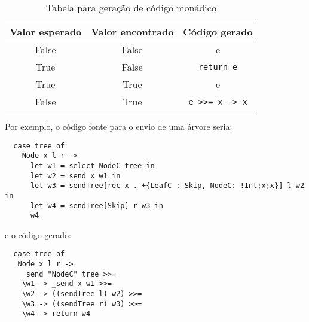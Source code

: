 


\begin{table}
\begin{center}
  \begin{tabular}[ht!]{| c | c | c |}
    \hline  
    \quad Valor esperado \quad&\quad Valor encontrado \quad&\quad Código gerado \quad\\\hline
    False & False & e \\
    True & False & \lstinline"return e" \\
    True & True & e \\
    False & True & \lstinline"e >>= x -> x" \\
    \hline
  \end{tabular}
  \vspace{0.2cm}
  \caption{Tabela para geração de código monádico}
  \label{tab:monad}
\end{center}
\end{table}

Por exemplo, o código fonte para o envio de uma árvore seria:

\begin{lstlisting}
  case tree of
    Node x l r ->
      let w1 = select NodeC tree in
      let w2 = send x w1 in
      let w3 = sendTree[rec x . +{LeafC : Skip, NodeC: !Int;x;x}] l w2 in
      let w4 = sendTree[Skip] r w3 in
      w4
\end{lstlisting}

e o código gerado:
\begin{lstlisting}
  case tree of
   Node x l r ->
    _send "NodeC" tree >>=
    \w1 -> _send x w1 >>=
    \w2 -> ((sendTree l) w2) >>=
    \w3 -> ((sendTree r) w3) >>=
    \w4 -> return w4 
\end{lstlisting}

